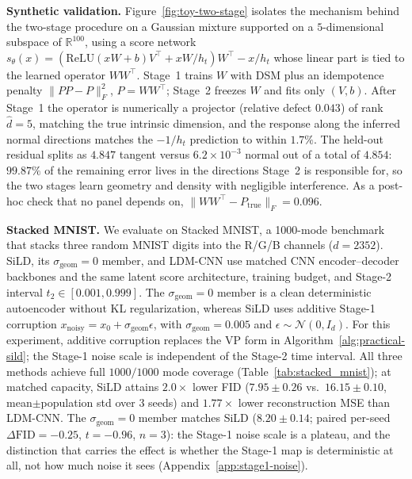 \textbf{Synthetic validation.}
Figure~\ref{fig:toy-two-stage} isolates the mechanism behind the two-stage
procedure on a Gaussian mixture supported on a $5$-dimensional subspace of
$\mathbb R^{100}$, using a score network $s_\theta(x)=(\mathrm{ReLU}(xW+b)V^\top
+ xW/h_t)W^\top - x/h_t$ whose linear part is tied to the learned operator
$WW^\top$. Stage~1 trains $W$ with DSM plus an idempotence penalty
$\lVert PP-P\rVert_F^2$, $P=WW^\top$; Stage~2 freezes $W$ and fits only
$(V,b)$. After Stage~1 the operator is numerically a projector (relative
defect $0.043$) of rank $\hat d=5$, matching the true intrinsic dimension,
and the response along the inferred normal directions matches the $-1/h_t$
prediction to within $1.7\%$. The held-out residual splits as
$4.847$ tangent versus $6.2\times10^{-3}$ normal out of a total of
$4.854$: $99.87\%$ of the remaining error lives in the directions Stage~2 is
responsible for, so the two stages learn geometry and density with negligible
interference. As a post-hoc check that no panel depends on,
$\lVert WW^\top - P_{\mathrm{true}}\rVert_F = 0.096$.




\textbf{Stacked MNIST.}
We evaluate on Stacked MNIST, a 1000-mode benchmark that stacks three random MNIST digits into the R/G/B channels ($d=2352$). SiLD, its $\sigma_{\mathrm{geom}}\!=\!0$ member, and LDM-CNN use matched CNN encoder--decoder backbones and the same latent score architecture, training budget, and Stage-2 interval $t_2\in[0.001,0.999]$. The $\sigma_{\mathrm{geom}}\!=\!0$ member is a clean deterministic autoencoder without KL regularization, whereas SiLD uses additive Stage-1 corruption $x_{\mathrm{noisy}}=x_0+\sigma_{\mathrm{geom}}\epsilon$, with $\sigma_{\mathrm{geom}}=0.005$ and $\epsilon\sim\mathcal N(0,I_d)$. For this experiment, additive corruption replaces the VP form in Algorithm~\ref{alg:practical-sild}; the Stage-1 noise scale is independent of the Stage-2 time interval. All three methods achieve full $1000/1000$ mode coverage (Table~\ref{tab:stacked_mnist}); at matched capacity, SiLD attains $2.0\times$ lower FID ($7.95 \pm 0.26$ vs.\ $16.15 \pm 0.10$, mean$\pm$population std over 3 seeds) and $1.77\times$ lower reconstruction MSE than LDM-CNN. The $\sigma_{\mathrm{geom}}\!=\!0$ member matches SiLD ($8.20 \pm 0.14$; paired per-seed $\Delta\mathrm{FID}=-0.25$, $t=-0.96$, $n=3$): the Stage-1 noise scale is a plateau, and the distinction that carries the effect is whether the Stage-1 map is deterministic at all, not how much noise it sees (Appendix~\ref{app:stage1-noise}).


